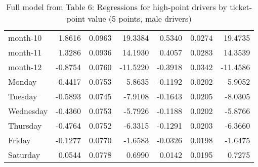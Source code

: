 \documentclass[10pt]{article}
\begin{document}
\begin{table}[ht]
\begin{tabular}{lrrrrrr}
  month-10 & 1.8616 & 0.0963 & 19.3384 & 0.5340 & 0.0274 & 19.4735 \\ 
  month-11 & 1.3286 & 0.0936 & 14.1930 & 0.4057 & 0.0283 & 14.3539 \\ 
  month-12 & -0.8754 & 0.0760 & -11.5220 & -0.3918 & 0.0342 & -11.4586 \\ 
  Monday & -0.4417 & 0.0753 & -5.8635 & -0.1192 & 0.0202 & -5.9052 \\ 
  Tuesday & -0.5893 & 0.0745 & -7.9108 & -0.1643 & 0.0205 & -8.0305 \\ 
  Wednesday & -0.4360 & 0.0753 & -5.7926 & -0.1188 & 0.0202 & -5.8766 \\ 
  Thursday & -0.4764 & 0.0752 & -6.3315 & -0.1291 & 0.0203 & -6.3660 \\ 
  Friday & -0.1277 & 0.0770 & -1.6583 & -0.0326 & 0.0198 & -1.6475 \\ 
  Saturday & 0.0544 & 0.0778 & 0.6990 & 0.0142 & 0.0195 & 0.7275 \\ 
   \hline
\end{tabular}
\caption{Full model from Table 6: Regressions for high-point drivers by ticket-point value (5 points, male drivers)} 
\label{tab_6_5_pts_no_age_M}
\end{table}


\clearpage
\pagebreak



\end{document}

